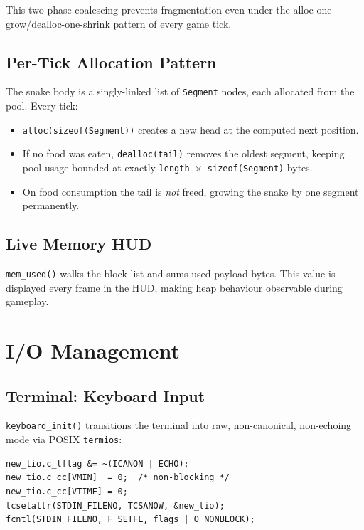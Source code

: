 \documentclass[conference]{IEEEtran}
\begin{document}
This two-phase coalescing prevents fragmentation even under the
alloc-one-grow/dealloc-one-shrink pattern of every game tick.

\subsection{Per-Tick Allocation Pattern}

The snake body is a singly-linked list of \texttt{Segment} nodes, each
allocated from the pool. Every tick:
\begin{itemize}
  \item \texttt{alloc(sizeof(Segment))} creates a new head at the computed
        next position.
  \item If no food was eaten, \texttt{dealloc(tail)} removes the oldest
        segment, keeping pool usage bounded at exactly
        \texttt{length $\times$ sizeof(Segment)} bytes.
  \item On food consumption the tail is \emph{not} freed, growing the snake
        by one segment permanently.
\end{itemize}

\subsection{Live Memory HUD}

\texttt{mem\_used()} walks the block list and sums used payload bytes.
This value is displayed every frame in the HUD, making heap behaviour
observable during gameplay.

\section{I/O Management}

\subsection{Terminal: Keyboard Input}

\texttt{keyboard\_init()} transitions the terminal into raw, non-canonical,
non-echoing mode via POSIX \texttt{termios}:

\begin{lstlisting}
new_tio.c_lflag &= ~(ICANON | ECHO);
new_tio.c_cc[VMIN]  = 0;  /* non-blocking */
new_tio.c_cc[VTIME] = 0;
tcsetattr(STDIN_FILENO, TCSANOW, &new_tio);
fcntl(STDIN_FILENO, F_SETFL, flags | O_NONBLOCK);
\end{lstlisting}
\end{document}
